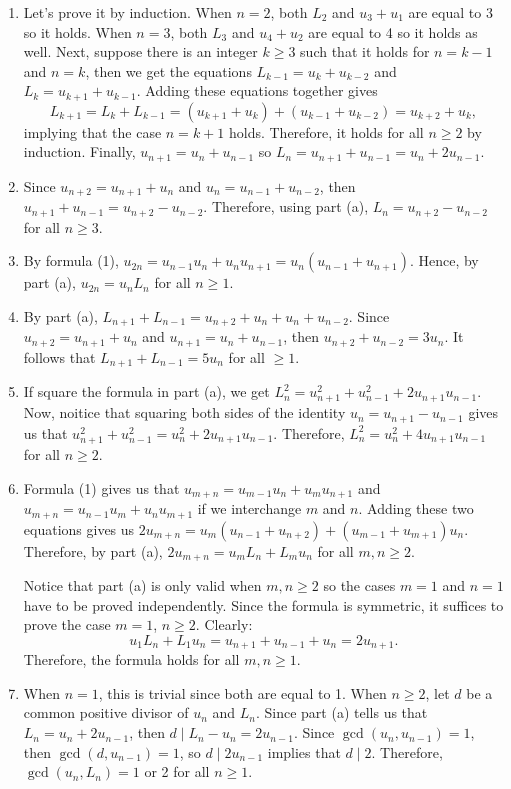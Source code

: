 \begin{solution}
    \begin{enumerate}
        \item Let's prove it by induction. When $n = 2$, both $L_2$ and $u_3 + u_1$ are equal to 3 so it holds. When $n = 3$, both $L_3$ and $u_4 + u_2$ are equal to 4 so it holds as well. Next, suppose there is an integer $k \geq 3$ such that it holds for $n = k-1$ and $n = k$, then we get the equations $L_{k-1} = u_k + u_{k-2}$ and $L_k = u_{k+1} + u_{k-1}$. Adding these equations together gives
        $$L_{k+1} = L_k + L_{k-1} = (u_{k+1} + u_k) + (u_{k-1} + u_{k-2}) = u_{k+2} + u_k,$$
        implying that the case $n = k+1$ holds. Therefore, it holds for all $n \geq 2$ by induction. Finally, $u_{n+1} = u_n + u_{n-1}$ so $L_n = u_{n+1} + u_{n-1} = u_n + 2u_{n-1}$.
        \item Since $u_{n+2} = u_{n+1} + u_n$ and $u_n = u_{n-1} + u_{n-2}$, then $u_{n+1} + u_{n-1} =u_{n+2} - u_{n-2}$. Therefore, using part (a), $L_n = u_{n+2} - u_{n-2}$ for all $n \geq 3$.
        \item By formula (1), $u_{2n} = u_{n-1}u_n + u_nu_{n+1} = u_n(u_{n-1} + u_{n+1})$. Hence, by part (a), $u_{2n} = u_nL_n$ for all $n \geq 1$.
        \item By part (a), $L_{n+1} + L_{n-1} = u_{n+2} + u_n + u_n + u_{n-2}$. Since $u_{n+2} = u_{n+1} + u_n$ and $u_{n+1} = u_n + u_{n-1}$, then $u_{n+2} + u_{n-2} = 3u_n$. It follows that $L_{n+1} + L_{n-1} = 5u_n$ for all $\geq 1$.
        \item If square the formula in part (a), we get $L_n^2 = u_{n+1}^2 + u_{n-1}^2 + 2u_{n+1}u_{n-1}$. Now, noitice that squaring both sides of the identity $u_n = u_{n+1} - u_{n-1}$ gives us that $u_{n+1}^2 + u_{n-1}^2 = u_n^2 + 2u_{n+1}u_{n-1}$. Therefore, $L_n^2 = u_n^2 + 4u_{n+1}u_{n-1}$ for all $n \geq 2$.
        \item Formula (1) gives us that $u_{m+n} = u_{m-1}u_n + u_mu_{n+1}$ and $u_{m+n} = u_{n-1}u_m + u_nu_{m+1}$ if we interchange $m$ and $n$. Adding these two equations gives us $2u_{m+n} = u_m(u_{n-1} + u_{n+2}) + (u_{m-1} + u_{m+1})u_n$. Therefore, by part (a), $2u_{m+n} = u_mL_n + L_mu_n$ for all $m,n \geq 2$. 
        
        Notice that part (a) is only valid when $m,n \geq 2$ so the cases $m = 1$ and $n = 1$ have to be proved independently. Since the formula is symmetric, it suffices to prove the case $m = 1$, $n \geq 2$. Clearly:
        $$u_1L_n + L_1u_n = u_{n+1} + u_{n-1} + u_n = 2u_{n+1}.$$
        Therefore, the formula holds for all $m,n \geq 1$.
        \item When $n = 1$, this is trivial since both are equal to 1. When $n \geq 2$, let $d$ be a common positive divisor of $u_n$ and $L_n$. Since part (a) tells us that $L_n = u_n + 2u_{n-1}$, then $d \mid L_n - u_n = 2u_{n-1}$. Since $\gcd(u_n, u_{n-1}) = 1$, then $\gcd(d, u_{n-1}) = 1$, so $d \mid 2u_{n-1}$ implies that $d \mid 2$. Therefore, $\gcd(u_n, L_n) = 1$ or 2 for all $n \geq 1$. \\
    \end{enumerate}
\end{solution}

